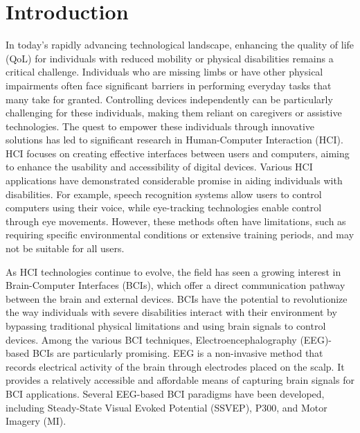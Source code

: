 \chapter{Introduction}\label{ch:introduction}
In today's rapidly advancing technological landscape, enhancing the quality of life (QoL) for individuals with reduced mobility or physical disabilities remains a critical challenge. 
Individuals who are missing limbs or have other physical impairments often face significant barriers in performing everyday tasks that many take for granted. 
Controlling devices independently can be particularly challenging for these individuals, making them reliant on caregivers or assistive technologies. 
The quest to empower these individuals through innovative solutions has led to significant research in Human-Computer Interaction (HCI).
HCI focuses on creating effective interfaces between users and computers, aiming to enhance the usability and accessibility of digital devices. 
Various HCI applications have demonstrated considerable promise in aiding individuals with disabilities. 
For example, speech recognition systems allow users to control computers using their voice, while eye-tracking technologies enable control through eye movements. 
However, these methods often have limitations, such as requiring specific environmental conditions or extensive training periods, and may not be suitable for all users.

As HCI technologies continue to evolve, the field has seen a growing interest in Brain-Computer Interfaces (BCIs), which offer a direct communication pathway between the brain and external devices. 
BCIs have the potential to revolutionize the way individuals with severe disabilities interact with their environment by bypassing traditional physical limitations and using brain signals to control devices.
Among the various BCI techniques, Electroencephalography (EEG)-based BCIs are particularly promising. 
EEG is a non-invasive method that records electrical activity of the brain through electrodes placed on the scalp. 
It provides a relatively accessible and affordable means of capturing brain signals for BCI applications. 
Several EEG-based BCI paradigms have been developed, including Steady-State Visual Evoked Potential (SSVEP), P300, and Motor Imagery (MI).

